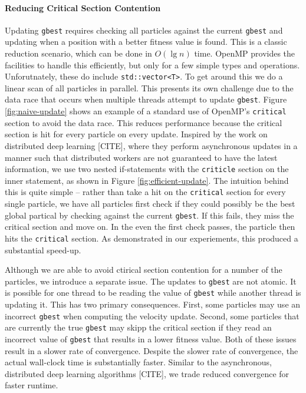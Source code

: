 \paragraph{Reducing Critical Section Contention} Updating \texttt{gbest}
requires checking all particles against the current \texttt{gbest} and updating
when a position with a better fitness value is found. This is a classic
reduction scenario, which can be done in $O(\lg n)$ time. OpenMP provides the
facilities to handle this efficiently, but only for a few simple types and
operations. Unforutnately, these do include \texttt{std::vector<T>}. To get
around this we do a linear scan of all particles in parallel. This presents its
own challenge due to the data race that occurs when multiple threads attempt to
update \texttt{gbest}. Figure \ref{fig:naive-update} shows an example of a
standard use of OpenMP's \texttt{critical} section to avoid the data race. This
reduces performance because the critical section is hit for every particle on
every update. Inspired by the work on distributed deep learning [CITE], where
they perform asynchronous updates in a manner such that distributed workers are
not guaranteed to have the latest information, we use two nested if-statements
with the \texttt{criticle} section on the inner statement, as shown in Figure
\ref{fig:efficient-update}. The intuition behind this is quite simple -- rather
than take a hit on the \texttt{critical} section for every single particle, we
have all particles first check if they could possibly be the best global
partical by checking against the current \texttt{gbest}. If this fails, they
miss the critical section and move on. In the even the first check passes, the
particle then hits the \texttt{critical} section. As demonstrated in our
experiements, this produced a substantial speed-up.

Although we are able to avoid ctirical section contention for a number of the
particles, we introduce a separate issue. The updates to \texttt{gbest} are not
atomic. It is possible for one thread to be reading the value of
\texttt{gbest} while another thread is updating it. This has two primary
consequences. First, some particles may use an incorrect \texttt{gbest} when
computing the velocity update. Second, some particles that are currently the true
\texttt{gbest} may skipp the critical section if they read an incorrect value of
\texttt{gbest} that results in a lower fitness value. Both of these issues
result in a slower rate of convergence. Despite the slower rate of convergence,
the actual wall-clock time is substantially faster. Similar to the asynchronous,
distributed deep learning algorithms [CITE], we trade reduced convergence for
faster runtime.


